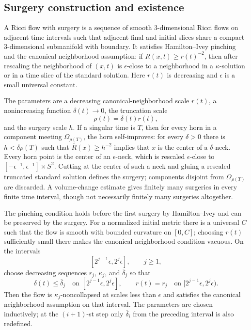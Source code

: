 \subsection{Surgery construction and existence}

A Ricci flow with surgery is a sequence of smooth $3$-dimensional Ricci flows
on adjacent time intervals such that adjacent final and initial slices share a
compact $3$-dimensional submanifold with boundary. It satisfies Hamilton--Ivey
pinching and the canonical neighborhood assumption: if
$R(x,t)\ge r(t)^{-2}$, then after rescaling the neighborhood of $(x,t)$ is
$\epsilon$-close to a neighborhood in a $\kappa$-solution or in a time slice
of the standard solution. Here $r(t)$ is decreasing and $\epsilon$ is a small
universal constant.

The parameters are a decreasing canonical-neighborhood scale $r(t)$, a
nonincreasing function $\delta(t)\to0$, the truncation scale
\[
\rho(t)=\delta(t)r(t),
\]
and the surgery scale $h$. If a singular time is $T$, then for every horn in
a component meeting $\Omega_{\rho(T)}$, the horn self-improves: for every
$\delta>0$ there is $h<\delta\rho(T)$ such that
$\overline R(x)\ge h^{-2}$ implies that $x$ is the center of a
$\delta$-neck. Every horn point is the center of an $\epsilon$-neck, which is
rescaled $\epsilon$-close to
$[-\epsilon^{-1},\epsilon^{-1}]\times S^2$. Cutting at the center of such a neck and gluing a rescaled
truncated standard solution defines the surgery; components disjoint from
$\Omega_{\rho(T)}$ are discarded. A volume-change estimate gives finitely
many surgeries in every finite time interval, though not necessarily finitely
many surgeries altogether.

The pinching condition holds before the first surgery by Hamilton--Ivey and
can be preserved by the surgery. For a normalized initial metric there is a
universal $C$ such that the flow is smooth with bounded curvature on $[0,C]$;
choosing $r(t)$ sufficiently small there makes the canonical neighborhood
condition vacuous. On the intervals
\[
[2^{j-1}\epsilon,2^j\epsilon],\qquad j\ge1,
\]
choose decreasing sequences $r_j$, $\kappa_j$, and
$\overline\delta_j$ so that
\[
\delta(t)\le\overline\delta_j\quad\text{on }[2^{j-1}\epsilon,2^j\epsilon],
\qquad
r(t)=r_j\quad\text{on }[2^{j-1}\epsilon,2^j\epsilon).
\]
Then the flow is $\kappa_j$-noncollapsed at scales less than $\epsilon$ and
satisfies the canonical neighborhood assumption on that interval. The
parameters are chosen inductively; at the $(i+1)$-st step only
$\overline\delta_i$ from the preceding interval is also redefined.


